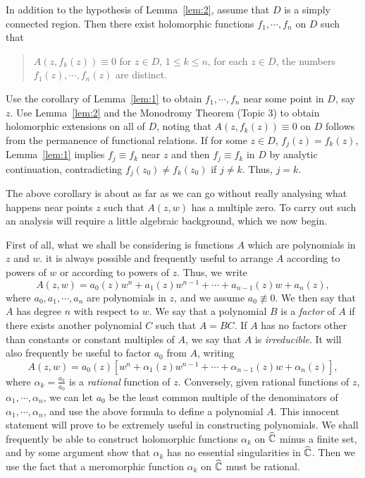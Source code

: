 \documentclass[a4paper,11pt]{article}
\begin{document}
\begin{cor}
  In addition to the hypothesis of Lemma~\ref{lem:2}, assume that $D$
  is a simply connected region.  Then there exist holomorphic
  functions $f_1, \cdots, f_n$ on $D$ such that
  \begin{quote}
    $A(z, f_k(z)) \equiv 0$ for $z \in D$, $1\le k \le n$, for each $z
    \in D$, the numbers $f_1(z), \cdots, f_n(z)$ are distinct.
  \end{quote}
\end{cor}

\begin{myproof}
  Use the corollary of Lemma~\ref{lem:1} to obtain $f_1, \cdots, f_n$
  near some point in $D$, say $z$.  Use Lemma~\ref{lem:2} and the
  Monodromy Theorem (Topic 3) to obtain holomorphic extensions on all
  of $D$, noting that $A(z,f_k(z)) \equiv 0$ on $D$ follows from the
  permanence of functional relations.  If for some $z \in D$, $f_j(z)
  = f_k(z)$, Lemma~\ref{lem:1} implies $f_j \equiv f_k$ near $z$ and
  then $f_j \equiv f_k$ in $D$ by analytic continuation, contradicting
  $f_j(z_0) \ne f_k(z_0)$ if $j\ne k$.  Thus, $j=k$.
\end{myproof}

The above corollary is about as far as we can go without really
analysing what happens near points $z$ such that $A(z,w)$ has a
multiple zero.  To carry out such an analysis will require a little
algebraic background, which we now begin.

First of all, what we shall be considering is functions $A$ which are
polynomials in $z$ and $w$.  it is always possible and frequently
useful to arrange $A$ according to powers of $w$ or according to
powers of $z$.  Thus, we write
$$
A(z,w) = a_0(z) w^n + a_1(z) w^{n-1} + \cdots + a_{n-1}(z) w + a_n(z),
$$
where $a_0, a_1, \cdots, a_n$ are polynomials in $z$, and we assume
$a_0 \not\equiv 0$.  We then say that $A$ has degree $n$ with respect
to $w$.  We say that a polynomial $B$ is a \emph{factor} of $A$ if
there exists another polynomial $C$ such that $A = BC$.  If $A$ has no
factors other than constants or constant multiples of $A$, we say that
$A$ is \emph{irreducible}.  It will also frequently be useful to
factor $a_0$ from $A$, writing
$$
A(z,w) = a_0(z)[w^n + \alpha_1(z) w^{n-1} + \cdots + \alpha_{n-1}(z) w
+ \alpha_n(z)],
$$
where $\alpha_k = \frac{a_k}{a_0}$ is a \emph{rational} function of
$z$.  Conversely, given rational functions of $z$, $\alpha_1, \cdots,
\alpha_n$, we can let $a_0$ be the least common multiple of the
denominators of $\alpha_1, \cdots, \alpha_n$, and use the above
formula to define a polynomial $A$.  This innocent statement will
prove to be extremely useful in constructing polynomials.  We shall
frequently be able to construct holomorphic functions $\alpha_k$ on
$\widehat{{\mathbb C}}$ minus a finite set, and by some argument show that
$\alpha_k$ has no essential singularities in $\widehat{{\mathbb C}}$.  Then
we use the fact that a meromorphic function $\alpha_k$ on
$\widehat{{\mathbb C}}$ must be rational.
\end{document}
